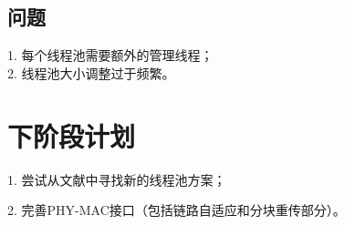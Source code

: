 \documentclass{article}
\begin{document}
\subsection{问题}
1. 每个线程池需要额外的管理线程；\\
2. 线程池大小调整过于频繁。



\section{下阶段计划}
1. 尝试从文献中寻找新的线程池方案；

2. 完善PHY-MAC接口（包括链路自适应和分块重传部分）。
\end{document}
